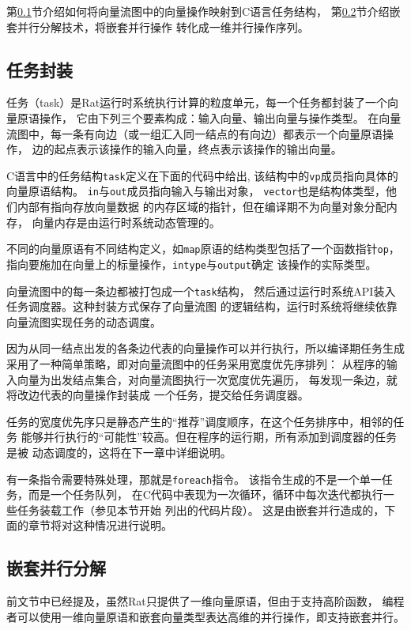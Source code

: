 第\ref{subsec:task-encapsulation}节介绍如何将向量流图中的向量操作映射到C语言任务结构，
第\ref{subsec:np-decomposition}节介绍嵌套并行分解技术，将嵌套并行操作
转化成一维并行操作序列。

\subsection{任务封装}\label{subsec:task-encapsulation}
任务（task）是Rat运行时系统执行计算的粒度单元，每一个任务都封装了一个向量原语操作，
它由下列三个要素构成：输入向量、输出向量与操作类型。
在向量流图中，每一条有向边（或一组汇入同一结点的有向边）都表示一个向量原语操作，
边的起点表示该操作的输入向量，终点表示该操作的输出向量。

C语言中的任务结构\texttt{task}定义在下面的代码中给出,
该结构中的\texttt{vp}成员指向具体的向量原语结构。
\texttt{in}与\texttt{out}成员指向输入与输出对象，
\texttt{vector}也是结构体类型，他们内部有指向存放向量数据
的内存区域的指针，但在编译期不为向量对象分配内存，
向量内存是由运行时系统动态管理的。

不同的向量原语有不同结构定义，如\texttt{map}原语的结构类型包括了一个函数指针\texttt{op}，
指向要施加在向量上的标量操作，\texttt{intype}与\texttt{output}确定
该操作的实际类型。


向量流图中的每一条边都被打包成一个\texttt{task}结构，
然后通过运行时系统API装入任务调度器。这种封装方式保存了向量流图
的逻辑结构，运行时系统将继续依靠向量流图实现任务的动态调度。

因为从同一结点出发的各条边代表的向量操作可以并行执行，所以编译期任务生成
采用了一种简单策略，即对向量流图中的任务采用宽度优先序排列：
从程序的输入向量为出发结点集合，对向量流图执行一次宽度优先遍历，
每发现一条边，就将改边代表的向量操作封装成
一个任务，提交给任务调度器。

任务的宽度优先序只是静态产生的“推荐”调度顺序，在这个任务排序中，相邻的任务
能够并行执行的“可能性”较高。但在程序的运行期，所有添加到调度器的任务是被
动态调度的，这将在下一章中详细说明。

有一条指令需要特殊处理，那就是\texttt{foreach}指令。
该指令生成的不是一个单一任务，而是一个任务队列，
在C代码中表现为一次循环，循环中每次迭代都执行一些任务装载工作（参见本节开始
列出的代码片段）。
这是由嵌套并行造成的，下面的章节将对这种情况进行说明。

\subsection{嵌套并行分解}\label{subsec:np-decomposition}
前文节中已经提及，虽然Rat只提供了一维向量原语，但由于支持高阶函数，
编程者可以使用一维向量原语和嵌套向量类型表达高维的并行操作，即支持嵌套并行。

